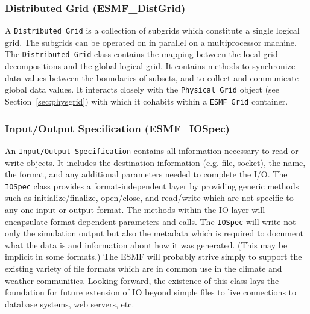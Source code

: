 \subsubsection{Distributed Grid (ESMF\_DistGrid)} 
\label{sec:distgrid} 
A {\tt Distributed Grid} is a collection of subgrids which
constitute a single logical grid.  The subgrids can be operated on in
parallel on a multiprocessor machine.  The {\tt Distributed Grid} class contains the mapping
between the local grid decompositions and the global logical grid. 
It contains methods to 
synchronize data values between the boundaries of subsets, and to
collect and communicate global data values.  It interacts closely with
the {\tt Physical Grid} object (see Section~\ref{sec:physgrid}) with 
which it cohabits within a {\tt ESMF\_Grid} container.

\subsubsection{Input/Output Specification (ESMF\_IOSpec)}
\label{sec:iospec} 
An {\tt Input/Output Specification} contains all 
information necessary to read or write objects.  It includes the 
destination information (e.g. file, socket), the name,
the format, and any additional parameters needed to complete the I/O.
The {\tt IOSpec} class provides a format-independent layer by
providing generic methods such as initialize/finalize, open/close, 
and read/write which are not specific to any one input or output format.
The methods
within the IO layer will encapsulate format dependent parameters and calls.
The {\tt IOSpec} will write not only the simulation output 
but also the metadata which is required to document what the data is
and information about how it was generated.  (This may be implicit in
some formats.)
The ESMF will probably strive simply to
support the existing variety of file formats which are in common use in
the climate and weather communities.  Looking forward,
the existence of this class lays the foundation for future extension 
of IO beyond simple files to live connections to database systems, 
web servers, etc.






